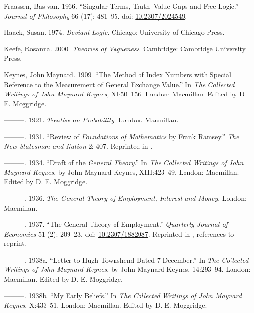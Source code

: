 \documentclass[
  10pt,
  letterpaper,
  DIV=11,
  numbers=noendperiod,
  twoside]{scrartcl}
\newlength{\cslhangindent}
\newenvironment{CSLReferences}[2] %
 {\begin{list}{}{%
  \setlength{\itemindent}{0pt}
  \setlength{\leftmargin}{0pt}
  \setlength{\parsep}{0pt}
  \ifodd #1
   \setlength{\leftmargin}{\cslhangindent}
   \setlength{\itemindent}{-1\cslhangindent}
  \fi
  \setlength{\itemsep}{#2\baselineskip}}}
 {\end{list}}
\begin{document}
\begin{CSLReferences}{1}{0}
Fraassen, Bas van. 1966. {``Singular Terms, Truth--Value Gaps and Free
Logic.''} \emph{Journal of Philosophy} 66 (17): 481--95. doi:
\href{https://doi.org/10.2307/2024549}{10.2307/2024549}.

Haack, Susan. 1974. \emph{Deviant Logic}. Chicago: University of Chicago
Press.

Keefe, Rosanna. 2000. \emph{Theories of Vagueness}. Cambridge: Cambridge
University Press.

Keynes, John Maynard. 1909. {``The Method of Index Numbers with Special
Reference to the Measurement of General Exchange Value.''} In \emph{The
Collected Writings of John Maynard Keynes}, XI:50--156. London:
Macmillan. Edited by D. E. Moggridge.

---------. 1921. \emph{Treatise on Probability}. London: Macmillan.

---------. 1931. {``Review of \emph{Foundations of Mathematics} by Frank
Ramsey.''} \emph{The New Statesman and Nation} 2: 407. Reprinted in
\cite[X 336-339]{KeynesCW}.

---------. 1934. {``Draft of the \emph{General Theory}.''} In \emph{The
Collected Writings of John Maynard Keynes}, by John Maynard Keynes,
XIII:423--49. London: Macmillan. Edited by D. E. Moggridge.

---------. 1936. \emph{The General Theory of Employment, Interest and
Money}. London: Macmillan.

---------. 1937. {``The General Theory of Employment.''} \emph{Quarterly
Journal of Economics} 51 (2): 209--23. doi:
\href{https://doi.org/10.2307/1882087}{10.2307/1882087}. Reprinted in
\cite[XIV 109-123]{KeynesCW}, references to reprint.

---------. 1938a. {``Letter to Hugh Townshend Dated 7 December.''} In
\emph{The Collected Writings of John Maynard Keynes}, by John Maynard
Keynes, 14:293--94. London: Macmillan. Edited by D. E. Moggridge.

---------. 1938b. {``My Early Beliefs.''} In \emph{The Collected
Writings of John Maynard Keynes}, X:433--51. London: Macmillan. Edited
by D. E. Moggridge.


\end{CSLReferences}
\end{document}
